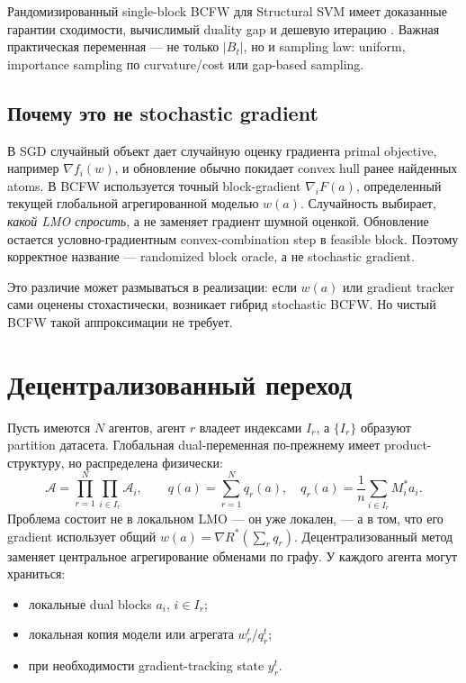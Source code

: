\documentclass[11pt,a4paper]{article}
\newcommand{\A}{\mathcal{A}}
\begin{document}
Рандомизированный single-block BCFW для Structural SVM имеет доказанные гарантии сходимости, вычислимый duality gap и дешевую итерацию \citep{lacostejulien2013block}. Важная практическая переменная --- не только \(|B_t|\), но и sampling law: uniform, importance sampling по curvature/cost или gap-based sampling.

\subsection{Почему это не stochastic gradient}

В SGD случайный объект дает случайную оценку градиента primal objective, например \(\nabla f_i(w)\), и обновление обычно покидает convex hull ранее найденных atoms. В BCFW используется точный block-gradient \(\nabla_iF(a)\), определенный текущей глобальной агрегированной моделью \(w(a)\). Случайность выбирает, \emph{какой LMO спросить}, а не заменяет градиент шумной оценкой. Обновление остается условно-градиентным convex-combination step в feasible block. Поэтому корректное название --- randomized block oracle, а не stochastic gradient.

Это различие может размываться в реализации: если \(w(a)\) или gradient tracker сами оценены стохастически, возникает гибрид stochastic BCFW. Но чистый BCFW такой аппроксимации не требует.

\section{Децентрализованный переход}

Пусть имеются \(N\) агентов, агент \(r\) владеет индексами \(I_r\), а \(\{I_r\}\) образуют partition датасета. Глобальная dual-переменная по-прежнему имеет product-структуру, но распределена физически:
\[
  \A=\prod_{r=1}^N\prod_{i\in I_r}\A_i,
  \qquad
  q(a)=\sum_{r=1}^N q_r(a),\quad
  q_r(a)=\frac1n\sum_{i\in I_r}M_i^*a_i.
\]
Проблема состоит не в локальном LMO --- он уже локален, --- а в том, что его gradient использует общий \(w(a)=\nabla R^*(\sum_rq_r)\). Децентрализованный метод заменяет центральное агрегирование обменами по графу. У каждого агента могут храниться:
\begin{itemize}
  \item локальные dual blocks \(a_i\), \(i\in I_r\);
  \item локальная копия модели или агрегата \(w_r^t\)/\(q_r^t\);
  \item при необходимости gradient-tracking state \(y_r^t\).
\end{itemize}
\end{document}
